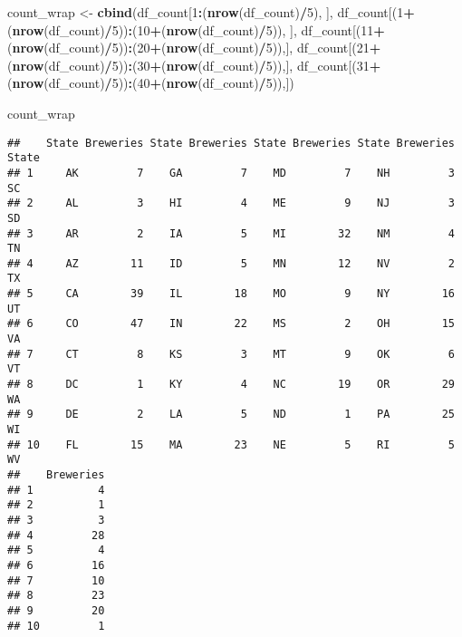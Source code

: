 \documentclass[]{article}
\newenvironment{Shaded}{\begin{snugshade}}{\end{snugshade}}
\newcommand{\DecValTok}[1]{\textcolor[rgb]{0.00,0.00,0.81}{#1}}
\newcommand{\KeywordTok}[1]{\textcolor[rgb]{0.13,0.29,0.53}{\textbf{#1}}}
\newcommand{\NormalTok}[1]{#1}
\newcommand{\OperatorTok}[1]{\textcolor[rgb]{0.81,0.36,0.00}{\textbf{#1}}}
\newcommand{\StringTok}[1]{\textcolor[rgb]{0.31,0.60,0.02}{#1}}
\begin{document}
\begin{Shaded}
\begin{Highlighting}[]
\NormalTok{count_wrap <-}\StringTok{ }\KeywordTok{cbind}\NormalTok{(df_count[}\DecValTok{1}\OperatorTok{:}\NormalTok{(}\KeywordTok{nrow}\NormalTok{(df_count)}\OperatorTok{/}\DecValTok{5}\NormalTok{), ], df_count[(}\DecValTok{1}\OperatorTok{+}\NormalTok{(}\KeywordTok{nrow}\NormalTok{(df_count)}\OperatorTok{/}\DecValTok{5}\NormalTok{))}\OperatorTok{:}\NormalTok{(}\DecValTok{10}\OperatorTok{+}\NormalTok{(}\KeywordTok{nrow}\NormalTok{(df_count)}\OperatorTok{/}\DecValTok{5}\NormalTok{)), ], df_count[(}\DecValTok{11}\OperatorTok{+}\NormalTok{(}\KeywordTok{nrow}\NormalTok{(df_count)}\OperatorTok{/}\DecValTok{5}\NormalTok{))}\OperatorTok{:}\NormalTok{(}\DecValTok{20}\OperatorTok{+}\NormalTok{(}\KeywordTok{nrow}\NormalTok{(df_count)}\OperatorTok{/}\DecValTok{5}\NormalTok{)),], df_count[(}\DecValTok{21}\OperatorTok{+}\NormalTok{(}\KeywordTok{nrow}\NormalTok{(df_count)}\OperatorTok{/}\DecValTok{5}\NormalTok{))}\OperatorTok{:}\NormalTok{(}\DecValTok{30}\OperatorTok{+}\NormalTok{(}\KeywordTok{nrow}\NormalTok{(df_count)}\OperatorTok{/}\DecValTok{5}\NormalTok{)),], df_count[(}\DecValTok{31}\OperatorTok{+}\NormalTok{(}\KeywordTok{nrow}\NormalTok{(df_count)}\OperatorTok{/}\DecValTok{5}\NormalTok{))}\OperatorTok{:}\NormalTok{(}\DecValTok{40}\OperatorTok{+}\NormalTok{(}\KeywordTok{nrow}\NormalTok{(df_count)}\OperatorTok{/}\DecValTok{5}\NormalTok{)),])}

\NormalTok{count_wrap }
\end{Highlighting}
\end{Shaded}

\begin{verbatim}
##    State Breweries State Breweries State Breweries State Breweries State
## 1     AK         7    GA         7    MD         7    NH         3    SC
## 2     AL         3    HI         4    ME         9    NJ         3    SD
## 3     AR         2    IA         5    MI        32    NM         4    TN
## 4     AZ        11    ID         5    MN        12    NV         2    TX
## 5     CA        39    IL        18    MO         9    NY        16    UT
## 6     CO        47    IN        22    MS         2    OH        15    VA
## 7     CT         8    KS         3    MT         9    OK         6    VT
## 8     DC         1    KY         4    NC        19    OR        29    WA
## 9     DE         2    LA         5    ND         1    PA        25    WI
## 10    FL        15    MA        23    NE         5    RI         5    WV
##    Breweries
## 1          4
## 2          1
## 3          3
## 4         28
## 5          4
## 6         16
## 7         10
## 8         23
## 9         20
## 10         1
\end{verbatim}
\end{document}
